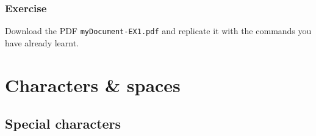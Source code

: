 \begin{frame}[fragile]
\frametitle{Exercise}

Download the PDF \alert{\texttt{myDocument-EX1.pdf}} and replicate it with the commands you have already learnt.

\end{frame}


\section{Characters \& spaces}


\subsection{Special characters}

